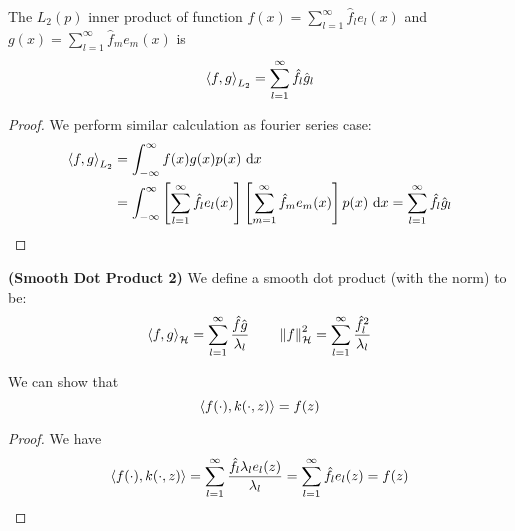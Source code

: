 \begin{proposition}
    The $L_2(p)$ inner product of function $f(x)=\sum^\infty_{l=1}\hat{f}_le_l(x)$ and $g(x)=\sum^\infty_{l=1}\hat{f}_me_m(x)$ is 
    \begin{equation*}
        \left\langle f,g \right\rangle_{L_2} = \sum^\infty_{l=1}\hat{f}_l\hat{g}_l
    \end{equation*}
\end{proposition}
\begin{proof}
    We perform similar calculation as fourier series case:
    \begin{equation*}
    \begin{aligned}
        \left\langle f, g \right\rangle_{L_2} &= \int^\infty_{-\infty} f(x)g(x)p(x)\ \mathrm{d} x \\ 
        &= \int^\infty_{-\infty} \left[ \sum^\infty_{l=1}\hat{f}_le_l(x) \right]\left[ \sum^\infty_{m=1}\hat{f}_me_m(x) \right]p(x)\ \mathrm{d} x = \sum^\infty_{l=1} \hat{f}_l\hat{g}_l
    \end{aligned}
    \end{equation*}
\end{proof}

\begin{definition}{\textbf{(Smooth Dot Product 2)}}
    We define a smooth dot product (with the norm) to be:
    \begin{equation*}
        \left\langle f, g \right\rangle_\mathcal{H} = \sum^\infty_{l=1}\frac{\hat{f}\hat{g}}{\lambda_l} \qquad \left\lVert f\right\rVert^2_\mathcal{H} = \sum^\infty_{l=1}\frac{\hat{f}_l^2}{\lambda_l}
    \end{equation*}
\end{definition}

\begin{proposition}
    We can show that 
    \begin{equation*}
        \left\langle f(\cdot), k(\cdot, z) \right\rangle = f(z)
    \end{equation*}
\end{proposition}
\begin{proof}
    We have 
    \begin{equation*}
        \left\langle f(\cdot), k(\cdot, z) \right\rangle = \sum^\infty_{l=1}\frac{\hat{f}_l\lambda_le_l(z)}{\lambda_l} = \sum^\infty_{l=1}\hat{f}_le_l(z) = f(z)
    \end{equation*}
\end{proof}

